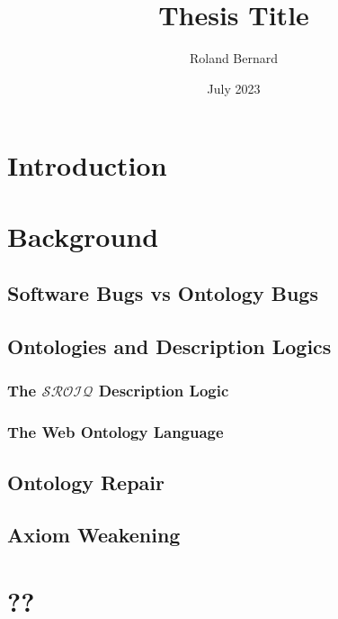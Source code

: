 \documentclass{report}
\title{Thesis Title}
\author{Roland Bernard}
\date{July 2023}
\begin{document}
\maketitle

\begin{abstract}

\end{abstract}

\tableofcontents

\chapter{Introduction}



\chapter{Background}

\section{Software Bugs vs Ontology Bugs}



\section{Ontologies and Description Logics}



\subsection{The $\mathcal{SROIQ}$ Description Logic}



\subsection{The Web Ontology Language}



\section{Ontology Repair}



\section{Axiom Weakening}



\chapter{??}

\printbibliography
\end{document}

